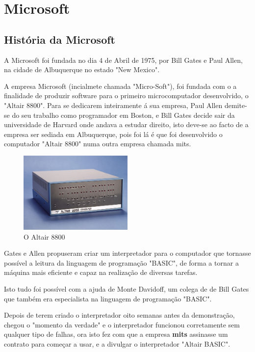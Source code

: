 \documentclass{report}
\begin{document}
\chapter{Microsoft}
\label{chap.microsoft}

\section{História da Microsoft}

A Microsoft foi fundada no dia 4 de Abril de 1975, por Bill Gates e Paul Allen, na cidade de Albuquerque no estado "New Mexico".

A empresa Microsoft (incialmete chamada "Micro-Soft"), foi fundada com o a finalidade de produzir software para o primeiro microcomputador desenvolvido, o "Altair 8800". Para se dedicarem inteiramente á sua empresa, Paul Allen
demite-se do seu trabalho como programador em Boston, e Bill Gates decide sair da universidade de Harvard onde andava a estudar direito, isto deve-se ao facto de a empresa ser sediada em Albuquerque, pois foi lá é que foi desenvolvido o computador "Altair 8800" numa outra empresa chamada \acs{mits}.

\vspace{5mm}
\begin{figure}[h!]
\includegraphics[width=0.5\textwidth]{altair-8800.jpg}
\centering
\caption{O Altair 8800}
\end{figure}
\vspace{5mm}

Gates e Allen propuseram criar um interpretador para o computador que tornasse possível a leitura da linguagem de programação "BASIC", de forma a tornar a máquina mais eficiente e capaz na realização de diversas tarefas.

Isto tudo foi possível com a ajuda de Monte Davidoff, um colega de de Bill Gates que também era especialista na linguagem de programação "BASIC".

Depois de terem criado o interpretador oito semanas antes da demonstração, chegou o "momento da verdade" e o interpretador funcionou corretamente sem qualquer tipo de falhas, ora isto fez com que a empresa \textbf{\ac{mits}} assinasse um contrato para começar a usar, e a divulgar o interpretador "Altair BASIC".
\end{document}
